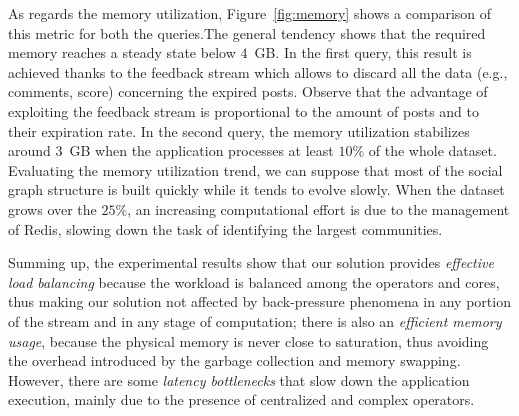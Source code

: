 As regards the memory utilization, Figure~\ref{fig:memory} shows a comparison of this metric for both the queries.The general tendency shows that the required memory reaches a steady state below $ 4 $~GB.
%
In the first query, this result is achieved thanks to the feedback stream which allows to discard all the data (e.g., comments, score) concerning the expired posts.
%
Observe that the advantage of exploiting the feedback stream is proportional to the amount of posts and to their expiration rate.
%
In the second query, the memory utilization stabilizes around $ 3 $~GB when the application processes at least $ 10 \% $ of the whole dataset.
Evaluating the memory utilization trend, we can suppose that most of the social graph structure is built quickly while it tends to evolve slowly.
%
When the dataset grows over the $ 25 \% $, an increasing computational effort is due to the management of Redis, slowing down the task of identifying the largest communities.

Summing up, the experimental results show that our solution provides  \textit{effective load balancing} because the workload is balanced among the operators and cores, thus making our solution not affected by back-pressure phenomena in any portion of the stream and in any stage of computation;
there is also an \textit{efficient memory usage}, because the physical memory is never close to saturation, thus avoiding the overhead introduced by the garbage collection and memory swapping.
However, there are some \textit{latency bottlenecks} that slow down the application execution, mainly due to the presence of centralized and complex operators.
